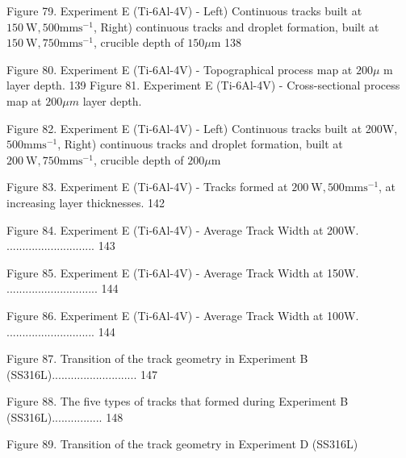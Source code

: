 \documentclass[10pt]{article}
\begin{document}
Figure 79. Experiment E (Ti-6Al-4V) - Left) Continuous tracks built at $150 \mathrm{~W}, 500 \mathrm{mms}^{-1}$, Right) continuous tracks and droplet formation, built at $150 \mathrm{~W}, 750 \mathrm{mms}^{-1}$, crucible depth of $150 \mu \mathrm{m}$ 138

Figure 80. Experiment E (Ti-6Al-4V) - Topographical process map at $200 \mu$ m layer depth. 139 Figure 81. Experiment E (Ti-6Al-4V) - Cross-sectional process map at $200 \mu m$ layer depth.

Figure 82. Experiment E (Ti-6Al-4V) - Left) Continuous tracks built at 200W, $500 \mathrm{mms}^{-1}$, Right) continuous tracks and droplet formation, built at $200 \mathrm{~W}, 750 \mathrm{mms}^{-1}$, crucible depth of $200 \mu \mathrm{m}$

Figure 83. Experiment E (Ti-6Al-4V) - Tracks formed at $200 \mathrm{~W}, 500 \mathrm{mms}^{-1}$, at increasing layer thicknesses. 142

Figure 84. Experiment E (Ti-6Al-4V) - Average Track Width at 200W. ............................ 143

Figure 85. Experiment E (Ti-6Al-4V) - Average Track Width at 150W. ............................. 144

Figure 86. Experiment E (Ti-6Al-4V) - Average Track Width at 100W. ............................ 144

Figure 87. Transition of the track geometry in Experiment B (SS316L)........................... 147

Figure 88. The five types of tracks that formed during Experiment B (SS316L)................ 148

Figure 89. Transition of the track geometry in Experiment D (SS316L)
\end{document}
